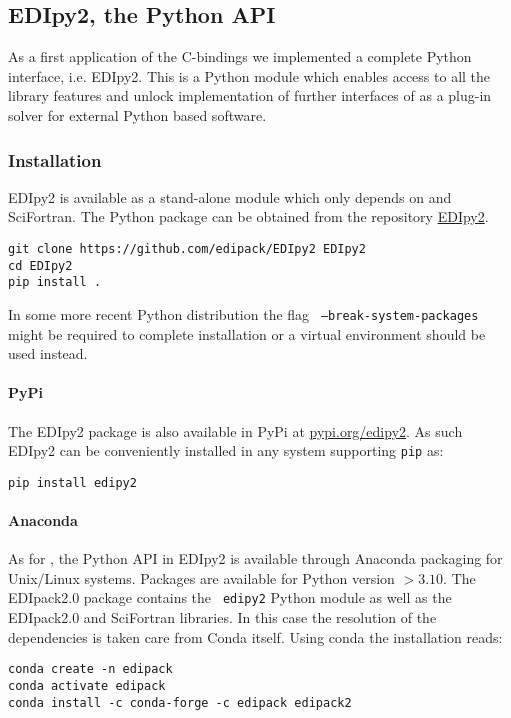 \documentclass[edipack2.tex]{subfiles}
\begin{document}




\subsection{EDIpy2, the Python API}\label{sSecInteropEDIpy}
As a first application of the \NAME C-bindings we implemented a
complete Python interface, i.e. EDIpy2. This is a Python module which
enables access to all the library features and unlock implementation of
further interfaces of \NAME as a plug-in solver for external Python
based software.    


\subsubsection{Installation}\label{sSecInteropEDIpyInstallation}
EDIpy2 is available as a stand-alone
module which only depends on \NAME and SciFortran.
The Python package can be obtained from the repository
\href{https://github.com/EDIpack/EDIpy2.0}{EDIpy2}.

\begin{lstlisting}[style=mybash]
git clone https://github.com/edipack/EDIpy2 EDIpy2
cd EDIpy2
pip install . 
\end{lstlisting}
In some more recent Python distribution the flag {\tt
  --break-system-packages} might be required to complete
installation or a virtual environment should be used instead. 


\paragraph{PyPi}
The EDIpy2 package is also available in PyPi at
\href{https://pypi.org/project/edipy2/}{pypi.org/edipy2}. As such
EDIpy2 can be conveniently installed in any system supporting {\tt pip} as:

\begin{lstlisting}[style=mybash]
pip install edipy2
\end{lstlisting}


\paragraph{Anaconda}
As for \NAME, the Python API in EDIpy2 is available through
Anaconda packaging for Unix/Linux systems. Packages are available for
Python version $>3.10$. The EDIpack2.0 package contains the {\tt
  edipy2} Python module as well as the EDIpack2.0 and SciFortran
libraries. In this case the resolution of the dependencies is
taken care from Conda itself. 
Using conda the installation reads:
\begin{lstlisting}[style=mybash]
conda create -n edipack
conda activate edipack
conda install -c conda-forge -c edipack edipack2
\end{lstlisting}
\end{document}
